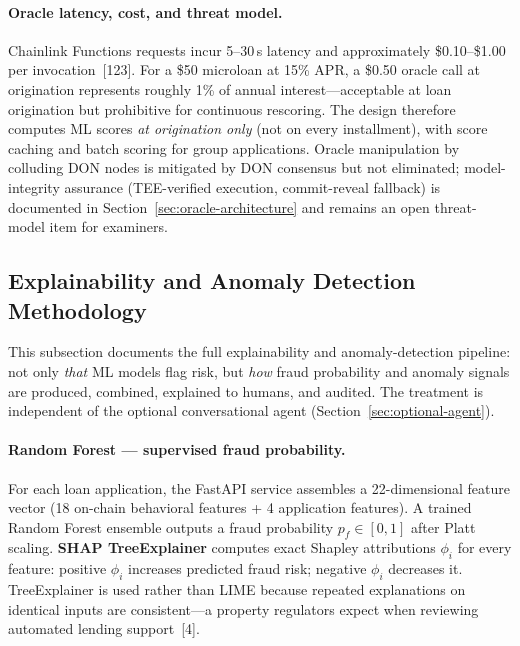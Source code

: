 \documentclass[12pt,a4paper]{report}
\begin{document}
\paragraph{Oracle latency, cost, and threat model.}
Chainlink Functions requests incur 5--30\,s latency and approximately \$0.10--\$1.00 per invocation~[123]. For a \$50 microloan at 15\% APR, a \$0.50 oracle call at origination represents roughly 1\% of annual interest---acceptable at loan origination but prohibitive for continuous rescoring. The design therefore computes ML scores \textit{at origination only} (not on every installment), with score caching and batch scoring for group applications. Oracle manipulation by colluding DON nodes is mitigated by DON consensus but not eliminated; model-integrity assurance (TEE-verified execution, commit-reveal fallback) is documented in Section~\ref{sec:oracle-architecture} and remains an open threat-model item for examiners.

\subsection{Explainability and Anomaly Detection Methodology}
\label{sec:ml-explainability}

This subsection documents the full explainability and anomaly-detection pipeline: not only \textit{that} ML models flag risk, but \textit{how} fraud probability and anomaly signals are produced, combined, explained to humans, and audited. The treatment is independent of the optional conversational agent (Section~\ref{sec:optional-agent}).

\paragraph{Random Forest --- supervised fraud probability.}
For each loan application, the FastAPI service assembles a 22-dimensional feature vector (18 on-chain behavioral features + 4 application features). A trained Random Forest ensemble outputs a fraud probability $p_f \in [0,1]$ after Platt scaling. \textbf{SHAP TreeExplainer} computes exact Shapley attributions $\phi_i$ for every feature: positive $\phi_i$ increases predicted fraud risk; negative $\phi_i$ decreases it. TreeExplainer is used rather than LIME because repeated explanations on identical inputs are consistent---a property regulators expect when reviewing automated lending support~[4].
\end{document}
